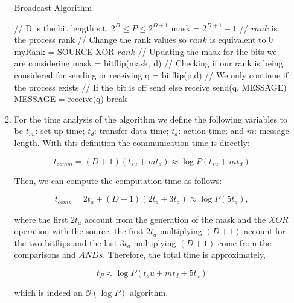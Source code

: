 \documentclass{article}
\begin{document}
\begin{enumerate}
\begin{enumerate}
\begin{algorithm}
\caption{Broadcast Algorithm}\label{broadcast}
\begin{algorithmic}[1]
\State // D is the bit length s.t. $2^D \leq P \leq 2^{D+1}$
\State mask = $2^{D+1} - 1$
\State // $rank$ is the process rank
\State // Change the rank values so $rank$ is equivalent to $0$ 
\State myRank = SOURCE XOR $rank$
	\State // Updating the mask for the bits we are considering
	\State mask = bitflip(mask, d)
	\State // Checking if our rank is being considered for sending or receiving
		\State q = bitflip(p,d)
		\State // We only continue if the process exists
			\State // If the bit is off send else receive
				\State send(q, MESSAGE)
			\Else
				\State MESSAGE = receive(q)
			\EndIf	
		\Else
			\State break
		\EndIf
	\EndIf
\EndFor
\EndProcedure
\end{algorithmic}
\end{algorithm}

\item For the time analysis of the algorithm we define the following variables to be $t_{su}$: set up time; $t_d$: transfer data time; $t_a$: action time; and $m$: message length. With this definition the communication time is directly:

\begin{equation}
	t_{comm} = (D+1)(t_{su} + m t_d) \approx \log P (t_{su} + m t_d)
\end{equation}

Then, we can compute the computation time as follows:

\begin{equation}
	t_{comp} = 2 t_a + (D+1) (2 t_a + 3 t_a) \approx \log P (5 t_a),
\end{equation}

where the first $2 t_a$ account from the generation of the mask and the $XOR$ operation with the source; the first $2 t_a$ multiplying $(D+1)$ account for the two bitflips and the last $3 t_a$ multiplying $(D+1)$ come from the comparisons and $ANDs$. Therefore, the total time is approximately,

\begin{equation}
	t_P \approx \log P (t_su + m t_d + 5 t_a)
\end{equation}

which is indeed an $\mathcal{O}(\log P)$ algorithm.


\end{enumerate}
\end{enumerate}
\end{document}
